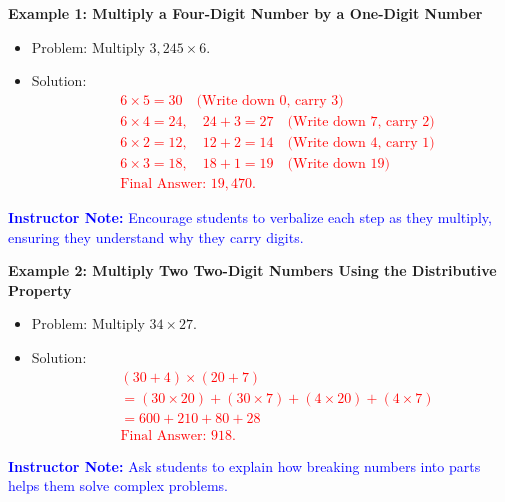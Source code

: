 \documentclass[12pt]{article}
\begin{document}
\vspace{1em}

\begin{tcolorbox}[colframe=black!60, colback=white, 
coltitle=black, colbacktitle=black!15, fonttitle=\bfseries\Large, 
title=Examples, halign title=center, left=10pt, right=10pt, top=10pt, bottom=15pt]
\textbf{Example 1: Multiply a Four-Digit Number by a One-Digit Number}
\begin{itemize}
    \item Problem: Multiply \( 3,245 \times 6 \).
    \item Solution:
    \textcolor{red}{
    \[
    \begin{aligned}
    &6 \times 5 = 30 \quad \text{(Write down 0, carry 3)} \\
    &6 \times 4 = 24, \quad 24 + 3 = 27 \quad \text{(Write down 7, carry 2)} \\
    &6 \times 2 = 12, \quad 12 + 2 = 14 \quad \text{(Write down 4, carry 1)} \\
    &6 \times 3 = 18, \quad 18 + 1 = 19 \quad \text{(Write down 19)} \\
    &\text{Final Answer: } 19,470.
    \end{aligned}
    \]}
\end{itemize}

\textcolor{blue}{\textbf{Instructor Note:} Encourage students to verbalize each step as they multiply, ensuring they understand why they carry digits.}

\textbf{Example 2: Multiply Two Two-Digit Numbers Using the Distributive Property}
\begin{itemize}
    \item Problem: Multiply \( 34 \times 27 \).
    \item Solution:
    \textcolor{red}{
    \[
    \begin{aligned}
    &(30 + 4) \times (20 + 7) \\
    &= (30 \times 20) + (30 \times 7) + (4 \times 20) + (4 \times 7) \\
    &= 600 + 210 + 80 + 28 \\
    &\text{Final Answer: } 918.
    \end{aligned}
    \]}
\end{itemize}

\textcolor{blue}{\textbf{Instructor Note:} Ask students to explain how breaking numbers into parts helps them solve complex problems.}
\end{tcolorbox}
\end{document}
